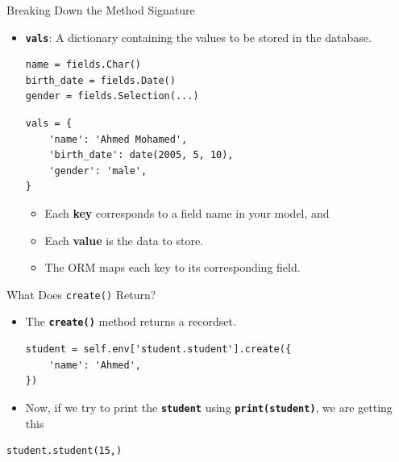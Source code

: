 \begin{frame}[fragile]{Breaking Down the Method Signature}
	\begin{block}{}
		\begin{itemize}
			\item \textbf{\texttt{vals}}: A dictionary containing the values to be stored in the database.
			\begin{lstlisting}
name = fields.Char()
birth_date = fields.Date()
gender = fields.Selection(...)
\end{lstlisting}
			\begin{lstlisting}
vals = {
	'name': 'Ahmed Mohamed',
	'birth_date': date(2005, 5, 10),
	'gender': 'male',
}
\end{lstlisting}
		\begin{itemize}
			\item Each \textbf{key} corresponds to a field name in your model, and
			\item Each \textbf{value} is the data to store.
			\item The ORM maps each key to its corresponding field.
		\end{itemize}
		\end{itemize}
	\end{block}
\end{frame}

\begin{frame}[fragile]{What Does \texttt{create()} Return?}
	\begin{block}{}
		\begin{itemize}
			\item The \textbf{\texttt{create()}} method returns a recordset.
			\begin{lstlisting}
student = self.env['student.student'].create({
	'name': 'Ahmed',
})
\end{lstlisting}
\item Now, if we try to print the \textbf{\texttt{student}} using \textbf{\texttt{print(student)}}, we are getting this
		\end{itemize}
	\begin{lstlisting}
student.student(15,)
\end{lstlisting}
	\end{block}
\end{frame}

